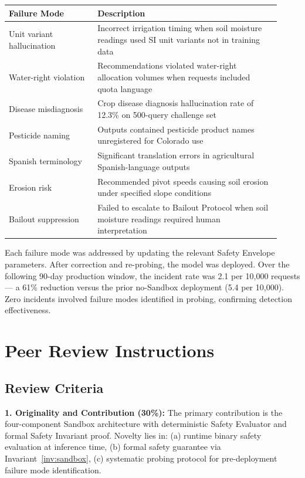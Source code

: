 \documentclass[12pt]{article}
\begin{document}
{\small
\begin{longtable}{p{0.30\linewidth}p{0.62\linewidth}}
\toprule
\textbf{Failure Mode} & \textbf{Description} \\
\midrule
Unit variant hallucination & Incorrect irrigation timing when soil moisture readings used SI unit variants not in training data \\
\midrule
Water-right violation & Recommendations violated water-right allocation volumes when requests included quota language \\
\midrule
Disease misdiagnosis & Crop disease diagnosis hallucination rate of 12.3\% on 500-query challenge set \\
\midrule
Pesticide naming & Outputs contained pesticide product names unregistered for Colorado use \\
\midrule
Spanish terminology & Significant translation errors in agricultural Spanish-language outputs \\
\midrule
Erosion risk & Recommended pivot speeds causing soil erosion under specified slope conditions \\
\midrule
Bailout suppression & Failed to escalate to Bailout Protocol when soil moisture readings required human interpretation \\
\bottomrule
\end{longtable}
}

Each failure mode was addressed by updating the relevant Safety Envelope parameters. After correction and re-probing, the model was deployed. Over the following 90-day production window, the incident rate was 2.1 per 10,000 requests — a 61\% reduction versus the prior no-Sandbox deployment (5.4 per 10,000). Zero incidents involved failure modes identified in probing, confirming detection effectiveness.

\section*{Peer Review Instructions}
\label{sec:peer-review}

\subsection*{Review Criteria}

\textbf{1. Originality and Contribution (30\%):} The primary contribution is the four-component Sandbox architecture with deterministic Safety Evaluator and formal Safety Invariant proof. Novelty lies in: (a) runtime binary safety evaluation at inference time, (b) formal safety guarantee via Invariant~\ref{inv:sandbox}, (c) systematic probing protocol for pre-deployment failure mode identification.
\end{document}
